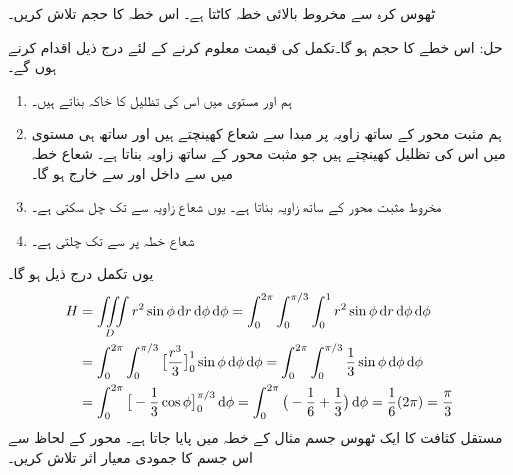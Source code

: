 ٹھوس کرہ  سے مخروط  بالائی     خطہ  کاٹتا ہے۔ اس خطہ کا حجم تلاش کریں۔

حل:\quad
اس خطے کا حجم  ہو گا۔تکمل کی قیمت معلوم کرنے کے لئے درج ذیل اقدام کرنے ہوں گے۔
\begin{enumerate}[1.]
\item
{}\quad
ہم  اور مستوی  میں اس کی تظلیل   کا خاکہ بناتے ہیں۔
\item
{}\quad
ہم مثبت  محور کے ساتھ  زاویہ پر  مبدا سے شعاع   کھینچتے ہیں اور ساتھ ہی   مستوی میں اس کی تظلیل   کھینچتے ہیں جو مثبت  محور کے ساتھ زاویہ  بناتا ہے۔ شعاع  خطہ میں  سے داخل اور  سے خارج ہو گا۔
\item
{}\quad
 مخروط   مثبت  محور کے ساتھ  زاویہ  بناتا ہے۔ یوں شعاع   زاویہ  سے  تک چل سکتی ہے۔
\item
{}\quad
شعاع  خطہ  پر    سے  تک چلتی ہے۔
\end{enumerate}
یوں تکمل درج ذیل ہو گا۔
\begin{align*}
H&=\iiint\limits_D r^2\sin\phi\dif r\dif \phi\dif \phi=\int_{0}^{2\pi}\int_{0}^{\pi/3}\int_{0}^{1} r^2\sin\phi\dif r\dif \phi\dif \phi\\
&=\int_{0}^{2\pi}\int_{0}^{\pi/3}\big[\frac{r^3}{3}\big]_0^1 \sin\phi\dif \phi\dif\phi=\int_{0}^{2\pi}\int_{0}^{\pi/3}\frac{1}{3} \sin\phi\dif\phi\dif\phi\\
&=\int_{0}^{2\pi}\big[-\frac{1}{3}\cos\phi\big]_{0}^{\pi/3} \dif\phi=\int_{0}^{2\pi} \big(-\frac{1}{6}+\frac{1}{3}\big)\dif\phi=\frac{1}{6}(2\pi)=\frac{\pi}{3}
\end{align*}
مستقل کثافت  کا ایک ٹھوس جسم مثال  کے خطہ  میں پایا جاتا ہے۔ محور  کے لحاظ سے اس جسم کا جمودی معیار اثر تلاش کریں۔

